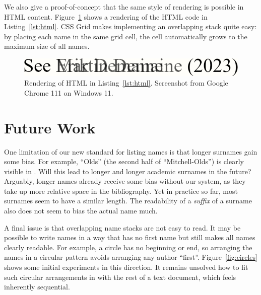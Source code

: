 \documentclass[natbib,authoryear]{sigtbd17-style}
\begin{document}

We also give a proof-of-concept that the same style of rendering is
possible in HTML content.  Figure~\ref{fig:html} shows a rendering
of the HTML code in Listing~\ref{lst:html}.
CSS Grid makes implementing an overlapping stack quite easy:
by placing each name in the same grid cell,
the cell automatically grows to the maximum size of all names.

\begin{figure}[htbp]
  \centering
  \includegraphics[scale=0.2]{figs/html.png}
  \caption{Rendering of HTML in Listing~\ref{lst:html}.
    Screenshot from Google Chrome 111 on Windows 11.}
  \label{fig:html}
\end{figure}



\section{Future Work}

One limitation of our new standard for listing names is that longer surnames
gain some bias.
For example, ``Olds'' (the second half of ``Mitchell-Olds'')
is clearly visible in \citet{currency-fluctuation}.
Will this lead to longer and longer academic surnames in the future?
Arguably, longer names already receive some bias without our system,
as they take up more relative space in the bibliography.
Yet in practice so far, most surnames seem to have a similar length.
The readability of a \emph{suffix} of a surname also does not seem to
bias the actual name much.

A final issue is that overlapping name stacks are not easy to read.
It may be possible to write names in a way that has no first name
but still makes all names clearly readable.
For example, a circle has no beginning or end, so arranging the names
in a circular pattern avoids arranging any author ``first''.
Figure~\ref{fig:circles} shows some initial experiments in this direction.
It remains unsolved how to fit such circular arrangements
in with the rest of a text document, which feels inherently sequential.
\end{document}
